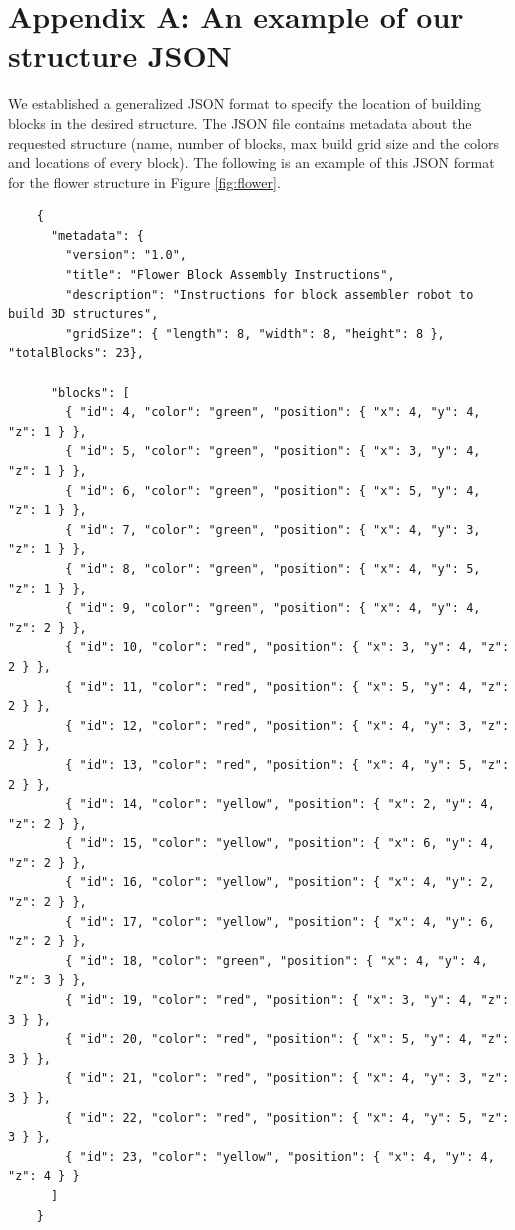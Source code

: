 \newpage
\section{Appendix A: An example of our structure JSON} \label{sec:appendix}

\noindent We established a generalized JSON format to specify the location of building blocks in the desired structure. The JSON file contains metadata about the requested structure (name, number of blocks, max build grid size and the colors and locations of every block). The following is an example of this JSON format for the flower structure in Figure \ref{fig:flower}. \\

\begin{lstlisting}
    {
      "metadata": { 
        "version": "1.0", 
        "title": "Flower Block Assembly Instructions", 
        "description": "Instructions for block assembler robot to build 3D structures", 
        "gridSize": { "length": 8, "width": 8, "height": 8 }, "totalBlocks": 23},
        
      "blocks": [
        { "id": 4, "color": "green", "position": { "x": 4, "y": 4, "z": 1 } },
        { "id": 5, "color": "green", "position": { "x": 3, "y": 4, "z": 1 } },
        { "id": 6, "color": "green", "position": { "x": 5, "y": 4, "z": 1 } },
        { "id": 7, "color": "green", "position": { "x": 4, "y": 3, "z": 1 } },
        { "id": 8, "color": "green", "position": { "x": 4, "y": 5, "z": 1 } },
        { "id": 9, "color": "green", "position": { "x": 4, "y": 4, "z": 2 } },
        { "id": 10, "color": "red", "position": { "x": 3, "y": 4, "z": 2 } },
        { "id": 11, "color": "red", "position": { "x": 5, "y": 4, "z": 2 } },
        { "id": 12, "color": "red", "position": { "x": 4, "y": 3, "z": 2 } },
        { "id": 13, "color": "red", "position": { "x": 4, "y": 5, "z": 2 } },
        { "id": 14, "color": "yellow", "position": { "x": 2, "y": 4, "z": 2 } },
        { "id": 15, "color": "yellow", "position": { "x": 6, "y": 4, "z": 2 } },
        { "id": 16, "color": "yellow", "position": { "x": 4, "y": 2, "z": 2 } },
        { "id": 17, "color": "yellow", "position": { "x": 4, "y": 6, "z": 2 } },
        { "id": 18, "color": "green", "position": { "x": 4, "y": 4, "z": 3 } },
        { "id": 19, "color": "red", "position": { "x": 3, "y": 4, "z": 3 } },
        { "id": 20, "color": "red", "position": { "x": 5, "y": 4, "z": 3 } },
        { "id": 21, "color": "red", "position": { "x": 4, "y": 3, "z": 3 } },
        { "id": 22, "color": "red", "position": { "x": 4, "y": 5, "z": 3 } },
        { "id": 23, "color": "yellow", "position": { "x": 4, "y": 4, "z": 4 } }
      ]
    }
\end{lstlisting}

